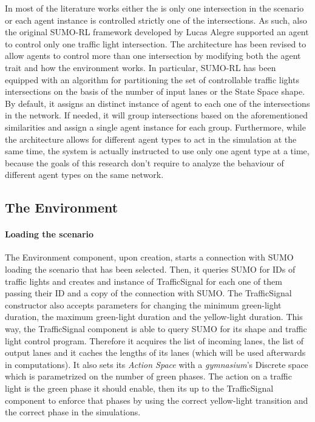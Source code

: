 In most of the literature works either the is only one intersection in the scenario or each agent instance is controlled strictly one of the intersections. As such, also the original SUMO-RL framework \cite{sumorl} developed by Lucas Alegre supported an agent to control only one traffic light intersection.
The architecture has been revised to allow agents to control more than one intersection by modifying both the agent trait and how the environment works.
In particular, SUMO-RL has been equipped with an algorithm for partitioning the set of controllable traffic lights intersections on the basis of the number of input lanes or the State Space shape.
By default, it assigns an distinct instance of agent to each one of the intersections in the network. If needed, it will group intersections based on the aforementioned similarities and assign a single agent instance for each group.
Furthermore, while the architecture allows for different agent types to act in the simulation at the same time, the system is actually instructed to use only one agent type at a time, because the goals of this research don't require to analyze the behaviour of different agent types on the same network.


\subsection{The Environment}


\paragraph{Loading the scenario}

The Environment component, upon creation, starts a connection with SUMO loading the scenario that has been selected. Then, it queries SUMO for IDs of traffic lights and creates and instance of TrafficSignal for each one of them passing their ID and a copy of the connection with SUMO.
The TrafficSignal constructor also accepts parameters for changing the minimum green-light duration, the maximum green-light duration and the yellow-light duration.
This way, the TrafficSignal component is able to query SUMO for its shape and traffic light control program.
Therefore it acquires the list of incoming lanes, the list of output lanes and it caches the lengths of its lanes (which will be used afterwards in computations).
It also sets its \textit{Action Space} with a \textit{gymnasium}'s Discrete space which is parametrized on the number of green phases.
The action on a traffic light is the green phase it should enable, then its up to the TrafficSignal component to enforce that phases by using the correct yellow-light transition and the correct phase in the simulations.

